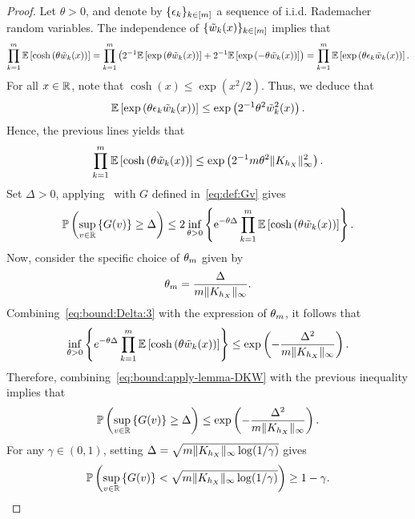   \begin{proof}
    Let $\theta>0$, and denote by $\{{\epsilon_{k}}\}_{k\in[m]}$ a sequence of i.i.d. Rademacher random variables.
    The independence of $\{{\tilde{w}_{k}(x)}\}_{k\in[m]}$ implies that
    \begin{equation*}
        \prod_{k=1}^{m} \mathbb{E}\left[{\cosh\left({\theta \tilde{w}_{k}(x)}\right)}\right]
        = \prod_{k=1}^{m} \left({2^{-1} \mathbb{E}\left[{\exp\left({\theta \tilde{w}_{k}(x)}\right)}\right] + 2^{-1} \mathbb{E}\left[{\exp\left({-\theta \tilde{w}_{k}(x)}\right)}\right]}\right)
        = \prod_{k=1}^{m} \mathbb{E}\left[{\exp\left({\theta \epsilon_{k} \tilde{w}_{k}(x)}\right)}\right].
    \end{equation*}
    For all $x\in\mathbb{R}$, note that $\cosh(x)\le\exp(x^2/2)$. Thus, we deduce that
    \begin{equation*}
        \mathbb{E}\left[{\exp\left({\theta \epsilon_{k} \tilde{w}_{k}(x)}\right)}\right]
        \le \exp\left({2^{-1} \theta^{2} \tilde{w}_{k}^{2}(x)}\right).
    \end{equation*}
    Hence, the previous lines yields that
    \begin{equation}\label{eq:bound:Delta:3}
        \prod_{k=1}^{m} \mathbb{E}\left[{\cosh\left({\theta \tilde{w}_{k}(x)}\right)}\right]
        \le \exp\left({
          2^{-1} m \theta^2 \|{K_{h_{X}}}\|_{\infty}^2 
        }\right).
    \end{equation}
    Set $\Delta>0$, applying~ with $G$ defined in~\eqref{eq:def:Gv} gives
    \begin{equation}\label{eq:bound:apply-lemma-DKW}
      \mathbb{P}\left({\sup_{v \in \mathbb{R}}\left\{{G(v)}\right\} \ge \Delta}\right)
      \le 2 \inf _{\theta>0} \left\{{\mathrm{e}^{- \theta \Delta} \prod_{k=1}^{m} \mathbb{E}\left[{\cosh\left({\theta \tilde{w}_{k}(x)}\right)}\right]}\right\}.
    \end{equation}
    Now, consider the specific choice of $\theta_{m}$ given by
    \[
        \theta_{m}
        = \frac{\Delta}{m \|{K_{h_{X}}}\|_{\infty}}.
    \]
    Combining~\eqref{eq:bound:Delta:3} with the expression of $\theta_{m}$, it follows that
    \begin{equation*}
        \inf_{\theta>0} \left\{{e^{- \theta \Delta} \prod_{k=1}^{m} \mathbb{E}\left[{ \cosh\left({\theta \tilde{w}_{k}(x)}\right) }\right]}\right\}
        \le \exp\left({- \frac{\Delta^2}{m \|{K_{h_{X}}}\|_{\infty}} }\right)
        .
    \end{equation*}
    Therefore, combining~\eqref{eq:bound:apply-lemma-DKW} with the previous inequality implies that
    \begin{equation}\label{eq:bound:Delta:4}
        \mathbb{P}\left({\sup_{v\in\mathbb{R}} \left\{{G(v)}\right\} \ge \Delta}\right)
        \le \exp\left({- \frac{\Delta^2}{m \|{K_{h_{X}}}\|_{\infty}} }\right)
        .
    \end{equation}
    For any $\gamma \in (0, 1)$, setting $\Delta = \sqrt{m \|{K_{h_{X}}}\|_{\infty} \log(1/\gamma)}$ gives
    \begin{equation}\label{eq:bound:Delta:5}
        \mathbb{P}\left({\sup_{v\in\mathbb{R}} \left\{{G(v)}\right\} < \sqrt{ m \|{K_{h_{X}}}\|_{\infty} \log({1}/{\gamma}) }}\right)
        \ge 1 - \gamma
        .
    \end{equation}
  \end{proof}
  
